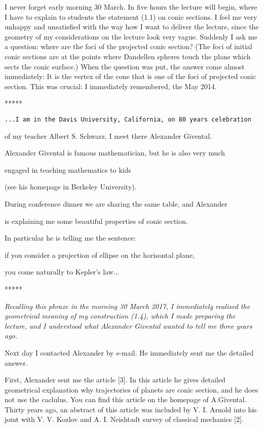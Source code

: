    I never forget early morning 30 March.  
 In five  hours the lecture will begin, 
where I have to explain to students the statement
(1.1) on conic sections.
I feel me very unhappy and unsatisfied with  
the way how I want to deliver the lecture, 
since the geometry of my considerations on the lecture
look very vague.
 Suddenly I ask me a question:  
  where are the foci of the projected conic section? 
(The foci of initial conic sections are at 
the points  where
 Dandellen spheres touch the plane which sects the conic surface.)  
   When the question was put, 
the answer come almost immediately:
  It is the vertex of the cone 
that is one of  the foci of projected
  conic section. This was crucial:
I immediately remembered, the May 2014.  


\medskip


\centerline {*****}

{\tt ...I am in the  
 Davis University,  California,
on 80 years celebration 

of my teacher 
 Albert S. Schwarz.
I meet there Alexander Givental. 

Alexander 
Givental is famous mathematician, 
but he is also
very much  

engaged  in 
teaching mathematics to kids


(see his homepage in Berkeley University).

During conference 
dinner we are sharing the same table, and Alexander

is explaining me some beautiful 
properties of conic section.

In  particular he is telling  
me  the sentence: 

 if you consider  a projection of
ellipse on the horisontal plane, 

you come naturally to
Kepler's law...
}
 
\centerline {*****}


  {\sl Recalling this phraze in 
the morning 30 March 2017,
 I immediately realised the geometrical meaning
of my construction (1.4), which I made preparing the lecture, and I understood what Alexander Givental wanted
to tell me three years ago.   
} 


   Next day  I contacted
Alexander by e-mail. He immediately sent me  
the detailed answer. 

   First, Alexander sent me the article [3]. 
In this article he  gives detailed
geometrical explanation why trajectories
of planets are conic section, and he does not use
the caclulus. You can find this article 
on the homepage
of  A.Givental. Thirty years ago, an abstract of this 
article was included by V. I. Arnold into 
his joint with V. V. Kozlov and A. I. Neishtadt 
survey of classical mechanics [2]. 

